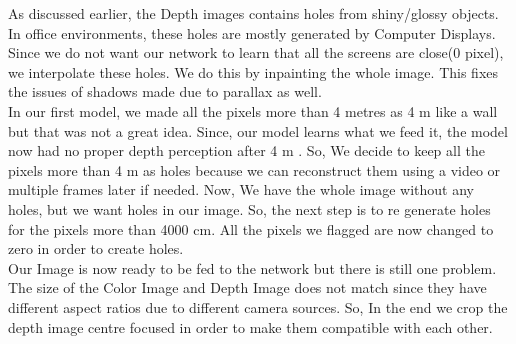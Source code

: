 As discussed earlier, the Depth images contains holes from shiny/glossy objects\cite{shiny}. In office environments, these holes are mostly generated by Computer Displays. Since we do not want our network to learn that all the screens are close(0 pixel), we interpolate these holes. We do this by inpainting the whole image. This fixes the issues of shadows made due to parallax as well. \\

In our first model, we made all the pixels more than 4 metres as 4 m like a wall but that was not a great idea. Since, our model learns what we feed it, the model now had no proper depth perception after 4 m  . So, We decide to keep all the pixels more than 4 m as holes because we can reconstruct them using a video or multiple frames later if needed. Now, We have the whole image without any holes, but we want holes in our image. So, the next step is to re generate holes for the pixels more than 4000 cm. All the pixels we flagged are now changed to zero in order to create holes. \\

Our Image is now ready to be fed to the network but there is still one problem. The size of the Color Image and Depth Image does not match since they have different aspect ratios due to different camera sources. So, In the end we crop the depth image centre focused in order to make them compatible with each other.\\

\newpage